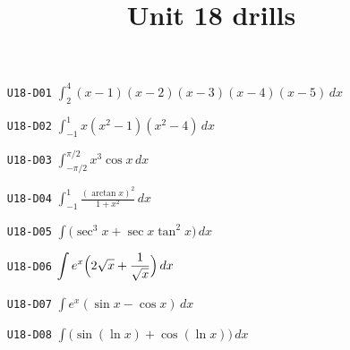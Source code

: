 
\title{Unit 18 drills}

\maketitle
\begin{enumerate}
  \item[\texttt{U18-D01}] $\displaystyle\int_{2}^{4}(x-1)(x-2)(x-3)(x-4)(x-5)\,dx$
  \item[\texttt{U18-D02}] $\displaystyle\int_{-1}^{1}x(x^{2}-1)(x^{2}-4)\,dx$
  \item[\texttt{U18-D03}] $\displaystyle\int_{-\pi/2}^{\pi/2}x^{3}\cos x\,dx$
  \item[\texttt{U18-D04}] $\displaystyle\int_{-1}^{1}\frac{(\arctan x)^{2}}{1+x^{2}}\,dx$
  \item[\texttt{U18-D05}] $\displaystyle\int\bigl(\sec^{3}x+\sec x\tan^{2}x\bigr)\,dx$
  \item[\texttt{U18-D06}] $\displaystyle\int e^{x}\Bigl(2\sqrt{x}+\frac{1}{\sqrt{x}}\Bigr)\,dx$
  \item[\texttt{U18-D07}] $\displaystyle\int e^{x}(\sin x-\cos x)\,dx$
  \item[\texttt{U18-D08}] $\displaystyle\int\bigl(\sin(\ln x)+\cos(\ln x)\bigr)\,dx$
\end{enumerate}


